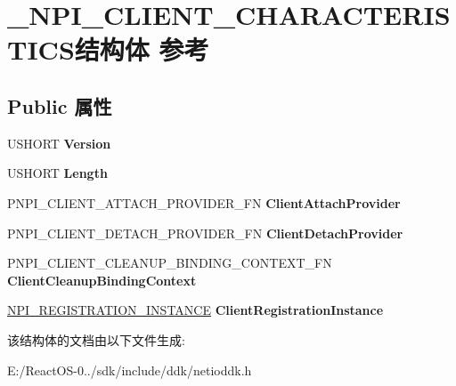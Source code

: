 \hypertarget{struct___n_p_i___c_l_i_e_n_t___c_h_a_r_a_c_t_e_r_i_s_t_i_c_s}{}\section{\+\_\+\+N\+P\+I\+\_\+\+C\+L\+I\+E\+N\+T\+\_\+\+C\+H\+A\+R\+A\+C\+T\+E\+R\+I\+S\+T\+I\+C\+S结构体 参考}
\label{struct___n_p_i___c_l_i_e_n_t___c_h_a_r_a_c_t_e_r_i_s_t_i_c_s}
\subsection*{Public 属性}
\begin{DoxyCompactItemize}
\item 
\mbox{\label{struct___n_p_i___c_l_i_e_n_t___c_h_a_r_a_c_t_e_r_i_s_t_i_c_s_a07301d15b007b80670f7d407376d65ad}} 
U\+S\+H\+O\+RT {\bfseries Version}
\item 
\mbox{\label{struct___n_p_i___c_l_i_e_n_t___c_h_a_r_a_c_t_e_r_i_s_t_i_c_s_ad324876f30166f9cc63764a31a9a7004}} 
U\+S\+H\+O\+RT {\bfseries Length}
\item 
\mbox{\label{struct___n_p_i___c_l_i_e_n_t___c_h_a_r_a_c_t_e_r_i_s_t_i_c_s_a7da24b4aa36d52e90d7c095cb1e33ada}} 
P\+N\+P\+I\+\_\+\+C\+L\+I\+E\+N\+T\+\_\+\+A\+T\+T\+A\+C\+H\+\_\+\+P\+R\+O\+V\+I\+D\+E\+R\+\_\+\+FN {\bfseries Client\+Attach\+Provider}
\item 
\mbox{\label{struct___n_p_i___c_l_i_e_n_t___c_h_a_r_a_c_t_e_r_i_s_t_i_c_s_aa9c7d6a649cdb2150a0a938764c97b09}} 
P\+N\+P\+I\+\_\+\+C\+L\+I\+E\+N\+T\+\_\+\+D\+E\+T\+A\+C\+H\+\_\+\+P\+R\+O\+V\+I\+D\+E\+R\+\_\+\+FN {\bfseries Client\+Detach\+Provider}
\item 
\mbox{\label{struct___n_p_i___c_l_i_e_n_t___c_h_a_r_a_c_t_e_r_i_s_t_i_c_s_a0b6d2ffbc202f1157d55a73c6f456935}} 
P\+N\+P\+I\+\_\+\+C\+L\+I\+E\+N\+T\+\_\+\+C\+L\+E\+A\+N\+U\+P\+\_\+\+B\+I\+N\+D\+I\+N\+G\+\_\+\+C\+O\+N\+T\+E\+X\+T\+\_\+\+FN {\bfseries Client\+Cleanup\+Binding\+Context}
\item 
\mbox{\label{struct___n_p_i___c_l_i_e_n_t___c_h_a_r_a_c_t_e_r_i_s_t_i_c_s_a1f88b821be20bed36f3866611899d626}} 
\hyperlink{struct___n_p_i___r_e_g_i_s_t_r_a_t_i_o_n___i_n_s_t_a_n_c_e}{N\+P\+I\+\_\+\+R\+E\+G\+I\+S\+T\+R\+A\+T\+I\+O\+N\+\_\+\+I\+N\+S\+T\+A\+N\+CE} {\bfseries Client\+Registration\+Instance}
\end{DoxyCompactItemize}


该结构体的文档由以下文件生成\+:\begin{DoxyCompactItemize}
\item 
E\+:/\+React\+O\+S-\/0../sdk/include/ddk/netioddk.\+h\end{DoxyCompactItemize}
